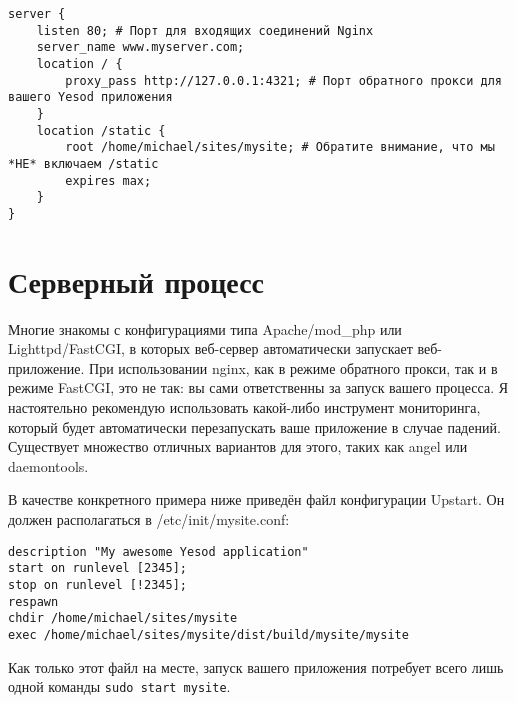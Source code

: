 \begin{lstlisting}
server {
    listen 80; # Порт для входящих соединений Nginx
    server_name www.myserver.com;
    location / {
        proxy_pass http://127.0.0.1:4321; # Порт обратного прокси для вашего Yesod приложения
    }
    location /static {
        root /home/michael/sites/mysite; # Обратите внимание, что мы *НЕ* включаем /static
        expires max;
    }
}
\end{lstlisting}
%

\section{Серверный процесс}

%
%
Многие знакомы с конфигурациями типа Apache/mod\_php или Lighttpd/FastCGI, в которых веб-сервер автоматически запускает веб-приложение. При использовании nginx, как в режиме обратного прокси, так и в режиме FastCGI, это не так: вы сами ответственны за запуск вашего процесса. Я настоятельно рекомендую использовать какой-либо инструмент мониторинга, который будет автоматически перезапускать ваше приложение в случае падений. Существует множество отличных вариантов для этого, таких как angel или daemontools.

В качестве конкретного примера ниже приведён файл конфигурации Upstart. Он должен располагаться в /etc/init/mysite.conf:

\begin{lstlisting}
description "My awesome Yesod application"
start on runlevel [2345];
stop on runlevel [!2345];
respawn
chdir /home/michael/sites/mysite
exec /home/michael/sites/mysite/dist/build/mysite/mysite
\end{lstlisting}
%

Как только этот файл на месте, запуск вашего приложения потребует всего лишь одной команды \lstinline{sudo start mysite}.
%
